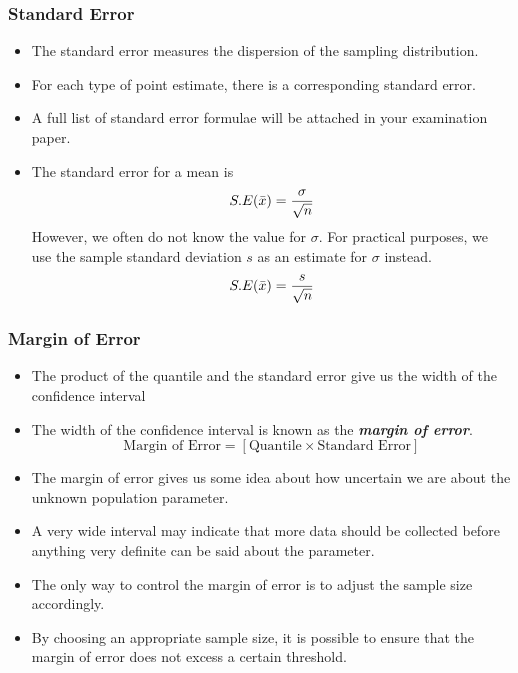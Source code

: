 \documentclass[a4]{beamer}
\begin{document}

\begin{frame}
\frametitle{Standard Error}

\begin{itemize}
\item The standard error measures the dispersion of the sampling distribution.
\item For each type of point estimate, there is a corresponding standard error.
\item A full list of standard error formulae will be attached in your examination paper.
\item The standard error for a  mean is
\[ S.E( \bar{x} )  = {\sigma \over \sqrt{n}} \]
However, we often do not know the value for $\sigma$. For practical purposes, we use the sample standard deviation $s$ as an estimate for $\sigma$ instead.
\[ S.E( \bar{x} )  = {s \over \sqrt{n}} \]
\end{itemize}

\end{frame}



\begin{frame}
\frametitle{Margin of Error}

\begin{itemize}
\item The product of the quantile and the standard error give us the width of the confidence interval
\item The width of the confidence interval is known as the \textbf{\emph{margin of error}}.  \[ \mbox{Margin of Error}  = \left[ \mbox{Quantile} \times \mbox{Standard Error} \right] \]
\item The margin of error gives us some idea about how uncertain we are about the unknown population parameter. \item A very wide interval may indicate that more data should be collected before anything very definite can be said about the parameter.
\item The only way to control the margin of error is to adjust the sample size accordingly.
\item By choosing an appropriate sample size, it is possible to ensure that the margin of error does not excess a certain threshold.
\end{itemize}

\end{frame}
\end{document}
